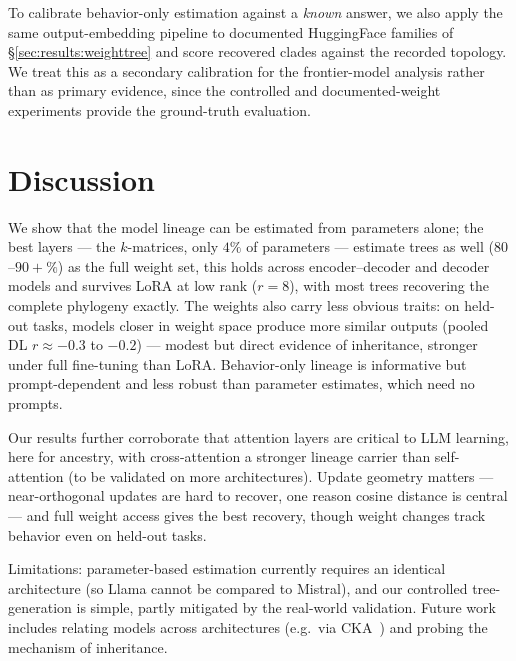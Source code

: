 \documentclass{article}
\theoremstyle{definition}
\theoremstyle{plain}
\begin{document}
To calibrate behavior-only estimation against a \emph{known} answer, we also apply the same
output-embedding pipeline to documented HuggingFace families of \S\ref{sec:results:weighttree} and
score recovered clades against the recorded topology. We treat this as a secondary calibration for the
frontier-model analysis rather than as primary evidence, since the controlled and documented-weight
experiments provide the ground-truth evaluation.


\section{Discussion}
\label{sec:discussion}

We show that the model lineage can be estimated from parameters alone; the best layers --- the
$k$-matrices, only $4\%$ of parameters --- estimate trees as well ($80$--$90{+}\%$) as the full weight
set, this holds across encoder--decoder and decoder models and survives LoRA at low rank ($r=8$),
with most trees recovering the complete phylogeny exactly. The weights also carry less obvious traits: on held-out
tasks, models closer in weight space produce more similar outputs (pooled DL $r\approx-0.3$ to $-0.2$)
--- modest but direct evidence of inheritance, stronger under full fine-tuning than LoRA. Behavior-only
lineage is informative but prompt-dependent and less robust than parameter estimates, which need no
prompts.

Our results further corroborate that attention layers are critical to LLM learning, here for ancestry,
with cross-attention a stronger lineage carrier than self-attention (to be validated on more
architectures). Update geometry matters --- near-orthogonal updates are hard to recover, one reason
cosine distance is central --- and full weight access gives the best recovery, though weight changes
track behavior even on held-out tasks.

Limitations: parameter-based estimation currently requires an identical architecture (so Llama cannot be
compared to Mistral), and our controlled tree-generation is simple, partly mitigated by the real-world
validation. Future work includes relating models across architectures (e.g.\ via
CKA~\citep{kornblith2019similarity}) and probing the mechanism of inheritance.


\end{document}
